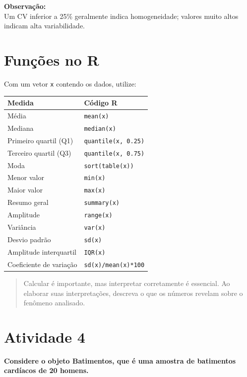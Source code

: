 \documentclass[
]{book}
\begin{document}
\textbf{Observação:}\\
Um CV inferior a 25\% geralmente indica homogeneidade; valores muito altos indicam alta variabilidade.

\section{Funções no R}\label{funuxe7uxf5es-no-r}

Com um vetor \texttt{x} contendo os dados, utilize:

\begin{longtable}[]{@{}ll@{}}
\toprule\noalign{}
Medida & Código R \\
\midrule\noalign{}
\endhead
\bottomrule\noalign{}
\endlastfoot
Média & \texttt{mean(x)} \\
Mediana & \texttt{median(x)} \\
Primeiro quartil (Q1) & \texttt{quantile(x,\ 0.25)} \\
Terceiro quartil (Q3) & \texttt{quantile(x,\ 0.75)} \\
Moda & \texttt{sort(table(x))} \\
Menor valor & \texttt{min(x)} \\
Maior valor & \texttt{max(x)} \\
Resumo geral & \texttt{summary(x)} \\
Amplitude & \texttt{range(x)} \\
Variância & \texttt{var(x)} \\
Desvio padrão & \texttt{sd(x)} \\
Amplitude interquartil & \texttt{IQR(x)} \\
Coeficiente de variação & \texttt{sd(x)/mean(x)*100} \\
\end{longtable}

\begin{quote}
Calcular é importante, mas interpretar corretamente é essencial. Ao elaborar suas interpretações, descreva o que os números revelam sobre o fenômeno analisado.
\end{quote}

\section{Atividade 4}\label{atividade-4}

\textbf{Considere o objeto Batimentos, que é uma amostra de batimentos cardíacos de 20 homens.}
\end{document}
